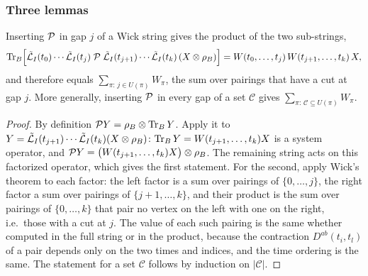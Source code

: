 \subsubsection{Three lemmas}

\begin{lemma}\label{lem:P-cut}
Inserting $\mathcal{P}$ in gap $j$ of a Wick string gives the product of the two sub-strings,
\begin{equation}
  \operatorname{Tr}_B\!\Big[\tilde{\mathcal{L}}_I(t_0)\cdots\tilde{\mathcal{L}}_I(t_j)\;\mathcal{P}\;\tilde{\mathcal{L}}_I(t_{j+1})\cdots\tilde{\mathcal{L}}_I(t_k)\,(X\otimes\rho_{B})\Big]
  =W(t_0,\dots,t_j)\,W(t_{j+1},\dots,t_k)\,X ,
\end{equation}
and therefore equals $\sum_{\pi:\,j\in U(\pi)}W_\pi$, the sum over pairings that have a cut at gap $j$.
More generally, inserting $\mathcal{P}$ in every gap of a set $\mathcal C$ gives $\sum_{\pi:\,\mathcal C\subseteq U(\pi)}W_\pi$.
\end{lemma}
\begin{proof}
By definition $\mathcal{P} Y=\rho_{B}\otimes\operatorname{Tr}_BY$.
Apply it to $Y=\tilde{\mathcal{L}}_I(t_{j+1})\cdots\tilde{\mathcal{L}}_I(t_k)(X\otimes\rho_{B})$: $\operatorname{Tr}_BY=W(t_{j+1},\dots,t_k)X$ is a system operator, and $\mathcal{P} Y=\big(W(t_{j+1},\dots,t_k)X\big)\otimes\rho_{B}$.
The remaining string acts on this factorized operator, which gives the first statement.
For the second, apply Wick's theorem to each factor: the left factor is a sum over pairings of $\{0,\dots,j\}$, the right factor a sum over pairings of $\{j+1,\dots,k\}$, and their product is the sum over pairings of $\{0,\dots,k\}$ that pair no vertex on the left with one on the right, i.e.\ those with a cut at $j$.
The value of each such pairing is the same whether computed in the full string or in the product, because the contraction $D^{ab}(t_i,t_l)$ of a pair depends only on the two times and indices, and the time ordering is the same.
The statement for a set $\mathcal C$ follows by induction on $|\mathcal C|$.
\end{proof}


